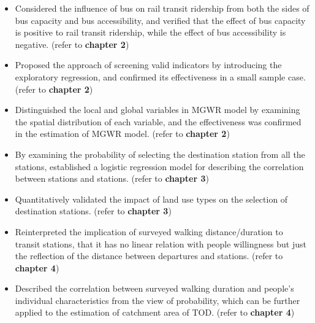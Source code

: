 \begin{itemize}
	\item Considered the influence of bus on rail transit ridership from both the sides of bus capacity and bus accessibility, and verified that the effect of bus capacity is positive to rail transit ridership, while the effect of bus accessibility is negative. (refer to \textbf{chapter 2})
	
	\item Proposed the approach of screening valid indicators by introducing the exploratory regression, and confirmed its effectiveness in a small sample case. (refer to \textbf{chapter 2})
	
	\item Distinguished the local and global variables in MGWR model by examining the spatial distribution of each variable, and the effectiveness was confirmed in the estimation of MGWR model. (refer to \textbf{chapter 2})
	
	\item By examining the probability of selecting the destination station from all the stations, established a logistic regression model for describing the correlation between stations and stations. (refer to \textbf{chapter 3})
	
	\item Quantitatively validated the impact of land use types on the selection of destination stations. (refer to \textbf{chapter 3})
	
	\item Reinterpreted the implication of surveyed walking distance/duration to transit stations, that it has no linear relation with people willingness but just the reflection of the distance between departures and stations. (refer to \textbf{chapter 4})
	
	\item Described the correlation between surveyed walking duration and people's individual characteristics from the view of probability, which can be further applied to the estimation of catchment area of TOD. (refer to \textbf{chapter 4})
	
\end{itemize} 



